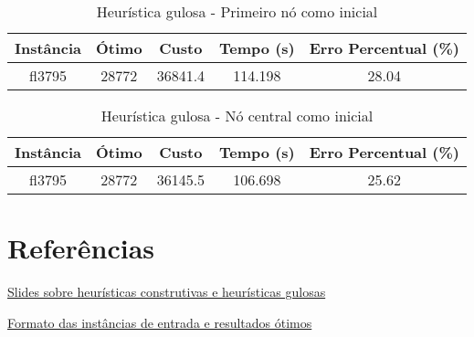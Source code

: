 \documentclass[10pt]{extarticle} %
\begin{document}
\begin{table}[H]
    \centering
    \begin{tabular}{|c|c|c|c|c|} \hline 
         \textbf{Instância} & \textbf{Ótimo} & \textbf{Custo} & \textbf{Tempo (s)} & \textbf{Erro Percentual (\%)} \\ \hline 
         fl3795       & 28772     & 36841.4    & 114.198  & 28.04 \\ \hline
    \end{tabular}
    \caption{Heurística gulosa - Primeiro nó como inicial}
    \label{tab:my_label}
\end{table}

\begin{table}[H]
    \centering
    \begin{tabular}{|c|c|c|c|c|} \hline 
         \textbf{Instância} & \textbf{Ótimo} & \textbf{Custo} & \textbf{Tempo (s)} & \textbf{Erro Percentual (\%)} \\ \hline 
         fl3795       & 28772     & 36145.5    & 106.698  & 25.62 \\ \hline
    \end{tabular}
    \caption{Heurística gulosa - Nó central como inicial}
    \label{tab:my_label}
\end{table}

\section{Referências}

\noindent \href{http://www.decom.ufop.br/prof/marcone/Disciplinas/InteligenciaComputacional/HeuristicasConstrutivas.pdf}{Slides sobre heurísticas construtivas e heurísticas gulosas}

\noindent \href{http://comopt.ifi.uni-heidelberg.de/software/TSPLIB95/}{Formato das instâncias de entrada e resultados ótimos}
\end{document}
